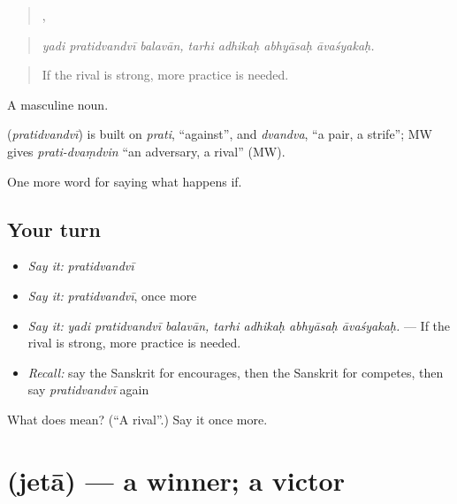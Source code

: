\begin{quote}
  ,    
\end{quote}

\begin{quote}
\emph{yadi pratidvandvī balavān, tarhi adhikaḥ abhyāsaḥ āvaśyakaḥ.}
\end{quote}

\begin{quote}
If the rival is strong, more practice is needed.
\end{quote}

A masculine noun.

\begin{cousinweb}
\textbf{} (\emph{pratidvandvī}) is built on \emph{prati}, \textquotedblleft{}against\textquotedblright{}, and \emph{dvandva}, \textquotedblleft{}a pair, a strife\textquotedblright{}; MW gives \emph{prati-dvaṃdvin} \textquotedblleft{}an adversary, a rival\textquotedblright{} (MW).
\end{cousinweb}

\begin{grammarlens}[title={What you've built}]
One more word for saying what happens if.
\end{grammarlens}

\subsection*{Your turn}
\begin{itemize}
\raggedright
  \item \emph{Say it:} \emph{pratidvandvī}
  \item \emph{Say it:} \emph{pratidvandvī}, once more
  \item \emph{Say it:} \emph{yadi pratidvandvī balavān, tarhi adhikaḥ abhyāsaḥ āvaśyakaḥ.} — If the rival is strong, more practice is needed.
  \item \emph{Recall:} say the Sanskrit for encourages, then the Sanskrit for competes, then say \emph{pratidvandvī} again
\end{itemize}

\begin{tcolorbox}[breakable,colback=teal!4,colframe=teal!35!black,title={Before you move on}]
What does  mean? (\textquotedblleft{}A rival\textquotedblright{}.) Say it once more.
\end{tcolorbox}
\section[\texorpdfstring{\sk{जेता} (jetā)}{जेता (jetā)}]{ (jetā) — a winner; a victor}

